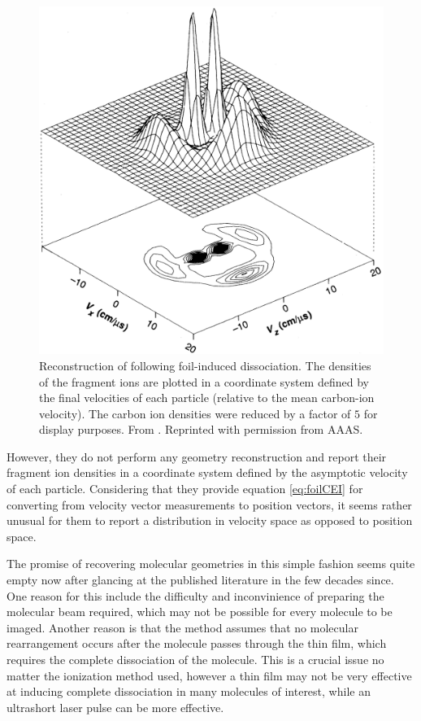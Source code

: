 \begin{figure}
  \centering
  \includegraphics[width=\textwidth]{gfx/VagerPseudoGeometry}
  \caption[Reconstruction of  following foil-induced dissociation.]
  {Reconstruction of  following foil-induced dissociation. The densities of the fragment ions are plotted in a coordinate system defined by the final velocities of each particle (relative to the mean carbon-ion velocity). The carbon ion densities were reduced by a factor of $5$ for display purposes. From \citet{Vager89}. Reprinted with permission from AAAS.}
  \label{fig:C2H3geometry}
\end{figure}

However, they do not perform any geometry reconstruction and report their fragment ion densities in a coordinate system defined by the asymptotic velocity of each particle. Considering that they provide equation \eqref{eq:foilCEI} for converting from velocity vector measurements to position vectors, it seems rather unusual for them to report a distribution in velocity space as opposed to position space.

The promise of recovering molecular geometries in this simple fashion seems quite empty now after glancing at the published literature in the few decades since. One reason for this include the difficulty and inconvinience of preparing the molecular beam required, which may not be possible for every molecule to be imaged. Another reason is that the method assumes that no molecular rearrangement occurs after the molecule passes through the thin film, which requires the complete dissociation of the molecule. This is a crucial issue no matter the ionization method used, however a thin film may not be very effective at inducing complete dissociation in many molecules of interest, while an ultrashort laser pulse can be more effective.

